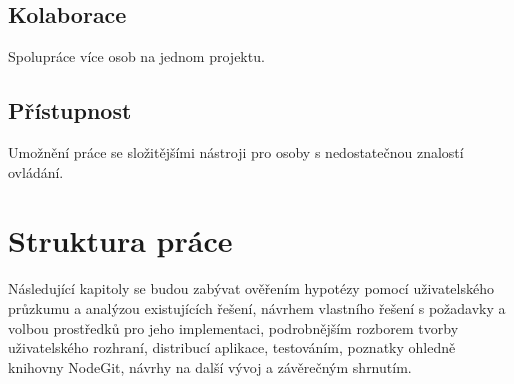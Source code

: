 \subsection{Kolaborace}

Spolupráce více osob na jednom projektu.

\subsection{Přístupnost}

Umožnění práce se složitějšími nástroji pro osoby s nedostatečnou znalostí ovládání.

\section{Struktura práce}

Následující kapitoly se budou zabývat ověřením hypotézy pomocí uživatelského průzkumu a analýzou existujících řešení, návrhem vlastního řešení s požadavky a volbou prostředků pro jeho implementaci, podrobnějším rozborem tvorby uživatelského rozhraní, distribucí aplikace, testováním, poznatky ohledně knihovny NodeGit, návrhy na další vývoj a závěrečným shrnutím.

